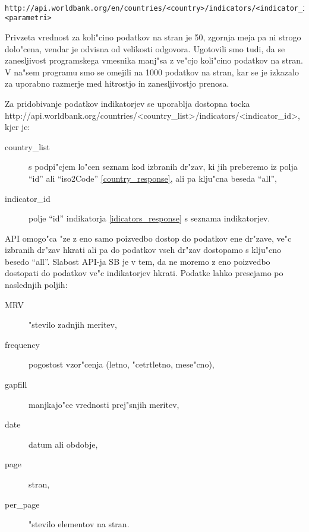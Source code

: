 \begin{snippet}
\begin{center}
\begin{lstlisting}
 http://api.worldbank.org/en/countries/<country>/indicators/<indicator_id>?<parametri>
\end{lstlisting}
\end{center}
\caption{}
\label{indicator_datase_request}
\end{snippet} 


Privzeta vrednost za
koli"cino podatkov na stran je 50, zgornja meja pa ni strogo dolo"cena, vendar
je odvisna od velikosti odgovora. Ugotovili smo tudi, da se zanesljivost
programskega vmesnika manj"sa z ve"cjo koli"cino podatkov na stran. V na"sem 
programu smo se omejili na 1000 podatkov na stran, kar se je izkazalo za 
uporabno razmerje med hitrostjo in zanesljivostjo prenosa. 


Za pridobivanje podatkov indikatorjev se uporablja dostopna tocka \\
http://api.worldbank.org/countries/<country\_list>/indicators/<indicator\_id>, \\
kjer je:


\begin{description}
\item [country\_list] s podpi"cjem lo"cen seznam kod izbranih dr"zav, ki jih 
	  preberemo iz polja ``id'' ali ``iso2Code'' \ref{country_response}, ali pa 
      klju"cna beseda ``all'',
\item [indicator\_id] polje ``id'' indikatorja \ref{idicators_response} s seznama
      indikatorjev.
\end{description}

API omogo"ca "ze z eno samo poizvedbo dostop do podatkov ene dr"zave, ve"c izbranih 
dr"zav hkrati ali pa do podatkov vseh dr"zav dostopamo s klju"cno besedo ``all''.
Slabost API-ja SB je v tem, da ne moremo z eno poizvedbo dostopati do podatkov
ve"c indikatorjev hkrati. Podatke lahko presejamo po naslednjih poljih:
\begin{description}  
\item [MRV] "stevilo zadnjih meritev,
\item [frequency] pogostost vzor"cenja (letno, "cetrtletno, mese"cno),
\item [gapfill] manjkajo"ce vrednosti prej"snjih meritev,
\item [date] datum ali obdobje,
\item [page] stran,
\item [per\_page] "stevilo elementov na stran.
\end{description}

